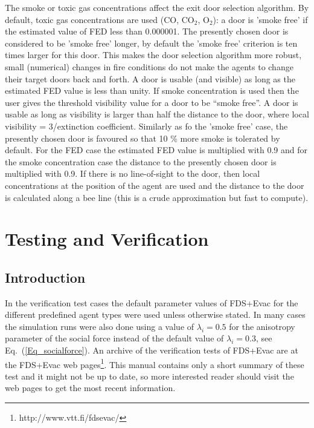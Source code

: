 \documentclass[12pt,a4paper,final,twoside]{stylevk}
\begin{document}
The smoke or toxic gas concentrations affect the exit door selection
algorithm.  By default, toxic gas concentrations are used (CO,
CO${}_2$, O${}_2$): a door is 'smoke free' if the estimated value of
FED less than 0.000001.  The presently chosen door is considered to be
'smoke free' longer, by default the 'smoke free' criterion is ten
times larger for this door.  This makes the door selection algorithm
more robust, small (numerical) changes in fire conditions do not make
the agents to change their target doors back and forth.  A door is
usable (and visible) as long as the estimated FED value is less than
unity.  If smoke concentration is used then the user gives the
threshold visibility value for a door to be ``smoke free''.  A door is
usable as long as visibility is larger than half the distance to the
door, where local visibility = 3/extinction coefficient.  Similarly as
fo the 'smoke free' case, the presently chosen door is favoured so
that 10 \% more smoke is tolerated by default.  For the FED case the
estimated FED value is multiplied with 0.9 and for the smoke
concentration case the distance to the presently chosen door is
multiplied with 0.9.  If there is no line-of-sight to the door, then
local concentrations at the position of the agent are used and the
distance to the door is calculated along a bee line (this is a crude
approximation but fast to compute).

\clearpage

\newpage


\chapter{Testing and Verification}\label{Sec_TestVerif}


\vspace{\fill}

\section{Introduction}

\vspace{\fill}

\noindent In the verification test cases the default parameter values
of FDS+Evac for the different predefined agent types were used unless
otherwise stated.  In many cases the simulation runs were also done
using a value of $\lambda_i=0.5$ for the anisotropy parameter of the
social force instead of the default value of $\lambda_i=0.3$, see
Eq.~(\ref{Eq_socialforce}).  An archive of the verification tests of
FDS+Evac are at the FDS+Evac web
pages\footnote{http://www.vtt.fi/fdsevac/}.  This manual contains only
a short summary of these test and it might not be up to date, so more
interested reader should visit the web pages to get the most recent
information.
\end{document}
